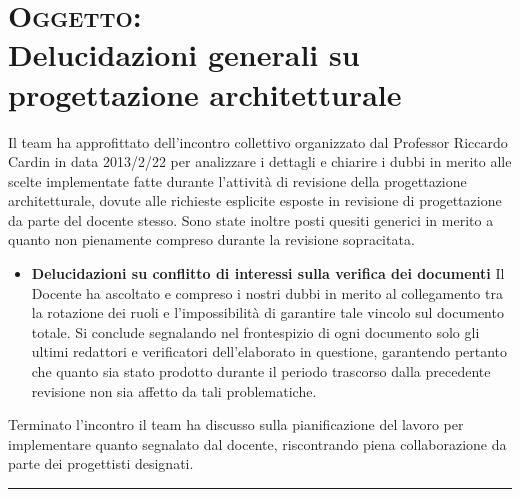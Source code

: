 \documentclass[a4paper,10pt,openright]{article}
\begin{document}
\section*{{\textsc{Oggetto:} \\Delucidazioni generali su progettazione architetturale}}
Il team ha approfittato dell'incontro collettivo organizzato dal Professor Riccardo Cardin in data 2013/2/22 per analizzare i dettagli e chiarire i dubbi in merito alle scelte implementate fatte durante l'attività di revisione della progettazione architetturale, dovute alle richieste esplicite esposte in revisione di progettazione da parte del docente stesso. Sono state inoltre posti quesiti generici in merito a quanto non pienamente compreso durante la revisione sopracitata.\\
\begin{itemize}
\item \textbf{Delucidazioni su conflitto di interessi sulla verifica dei documenti}
Il Docente ha ascoltato e compreso i nostri dubbi in merito al collegamento tra la rotazione dei ruoli e l'impossibilità di garantire tale vincolo sul documento totale. Si conclude segnalando nel frontespizio di ogni documento solo gli ultimi redattori e verificatori dell'elaborato in questione, garantendo pertanto che quanto sia stato prodotto durante il periodo trascorso dalla precedente revisione non sia affetto da tali problematiche.
\end{itemize}

Terminato l'incontro il team ha discusso sulla pianificazione del lavoro per implementare quanto segnalato dal docente, riscontrando piena collaborazione da parte dei progettisti designati.\\
\noindent\rule{\textwidth}{0.4pt}
\end{document}
